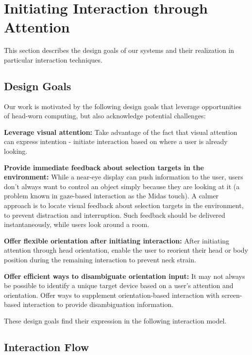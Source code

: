 \section{Initiating Interaction through Attention}
This section describes the design goals of our systems and their realization in particular interaction techniques.

\subsection{Design Goals}
Our work is motivated by the following design goals that leverage opportunities of head-worn computing, but also acknowledge potential challenges:

{\bf Leverage visual attention:} Take advantage of the fact that visual attention can express intention - initiate interaction based on where a user is already looking. 

{\bf Provide immediate feedback about selection targets in the environment:} While a near-eye display can push information to the user, users don't always want to control an object simply because they are looking at it (a problem known in gaze-based interaction as the Midas touch). A calmer~\cite{weiser_coming_1997} approach is to locate visual feedback about selection targets in the environment, to prevent distraction and interruption. Such feedback should be delivered instantaneously, while users look around a room.

{\bf Offer flexible orientation after initiating interaction:} After initiating attention through head orientation, enable the user to reorient their head or body position during the remaining interaction to prevent neck strain.

{\bf Offer efficient ways to disambiguate orientation input:} It may not always be possible to identify a unique target device based on a user's attention and orientation. Offer ways to supplement orientation-based interaction with screen-based interaction to provide disambiguation information.

These design goals find their expression in the following interaction model.

\subsection{Interaction Flow}

